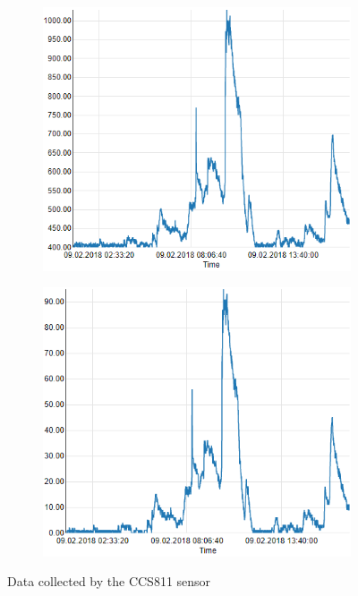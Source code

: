 \documentclass[bachelorthesis, grey, english]{mas-thesis-chapters} %
\begin{document}
\begin{figure}
\begin{subfigure}[c]{0.5\textwidth}
\includegraphics[width=1\textwidth]{expEval/eCO2_09-02-2018.PNG}
\label{fig:evalCO2}
\end{subfigure}
\begin{subfigure}[c]{0.5\textwidth}
\includegraphics[width=1\textwidth]{expEval/VOC_09-02-2018.PNG}
\label{fig:evalTVOC}
\end{subfigure}
\caption{Data collected by the CCS811 sensor}
\end{figure}
\end{document}
